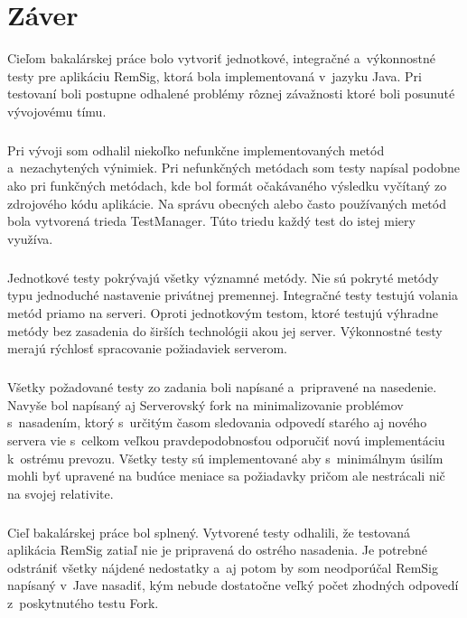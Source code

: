 \documentclass[
  printed, %
  notable,   %
  nolof,     %
    oneside,       %
  nolot,     %
]{fithesis3}
\begin{document}
\chapter{Záver}
Cieľom bakalárskej práce bolo vytvoriť jednotkové, integračné a~výkonnostné testy pre aplikáciu RemSig, ktorá bola implementovaná v~jazyku Java. Pri testovaní boli postupne odhalené problémy rôznej závažnosti ktoré boli posunuté vývojovému tímu. \paragraph{}
Pri vývoji som odhalil niekoľko nefunkčne implementovaných metód a~nezachytených výnimiek. Pri nefunkčných metódach som testy napísal podobne ako pri funkčných metódach, kde bol formát očakávaného výsledku vyčítaný zo zdrojového kódu aplikácie. Na správu obecných alebo často používaných metód bola vytvorená trieda TestManager. Túto triedu každý test do istej miery využíva. \paragraph{}
Jednotkové testy pokrývajú všetky významné metódy. Nie sú pokryté metódy typu jednoduché nastavenie privátnej premennej. Integračné testy testujú volania metód priamo na serveri. Oproti jednotkovým testom, ktoré testujú výhradne metódy bez zasadenia do širších technológii akou jej server. Výkonnostné testy merajú rýchlosť spracovanie požiadaviek serverom.\paragraph{}
Všetky požadované testy zo zadania boli napísané a~pripravené na nasedenie. Navyše bol napísaný aj Serverovský fork na minimalizovanie problémov s~nasadením, ktorý s~určitým časom sledovania odpovedí starého aj nového servera vie s~celkom veľkou pravdepodobnosťou odporučiť novú implementáciu k~ostrému prevozu. Všetky testy sú  implementované aby s~minimálnym úsilím mohli byť upravené na budúce meniace sa požiadavky pričom ale nestrácali nič na svojej relativite.\paragraph{}
Cieľ bakalárskej práce bol splnený. Vytvorené testy odhalili, že testovaná aplikácia RemSig zatiaľ nie je pripravená do ostrého nasadenia. Je potrebné odstrániť všetky nájdené nedostatky a~aj potom by som neodporúčal RemSig napísaný v~Jave nasadiť, kým nebude dostatočne veľký počet zhodných odpovedí z~poskytnutého testu Fork. 
\end{document}
